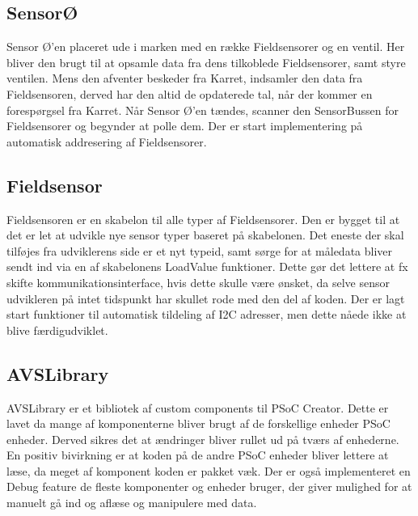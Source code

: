 \subsection{SensorØ}
Sensor Ø'en placeret ude i marken med en række Fieldsensorer og en ventil. Her bliver den brugt til at opsamle data fra dens tilkoblede Fieldsensorer, samt styre ventilen. Mens den afventer beskeder fra Karret, indsamler den data fra Fieldsensoren, derved har den altid de opdaterede tal, når der kommer en forespørgsel fra Karret. Når Sensor Ø'en tændes, scanner den SensorBussen for Fieldsensorer og begynder at polle dem. Der er start implementering på automatisk addresering af Fieldsensorer. 

\subsection{Fieldsensor}
Fieldsensoren er en skabelon til alle typer af Fieldsensorer. Den er bygget til at det er let at udvikle nye sensor typer baseret på skabelonen. Det eneste der skal tilføjes fra udviklerens side er et nyt typeid, samt sørge for at måledata bliver sendt ind via en af skabelonens LoadValue funktioner. Dette gør det lettere at fx skifte kommunikationsinterface, hvis dette skulle være ønsket, da selve sensor udvikleren på intet tidspunkt har skullet rode med den del af koden. Der er lagt start funktioner til automatisk tildeling af I2C adresser, men dette nåede ikke at blive færdigudviklet.

\subsection{AVSLibrary}
AVSLibrary er et bibliotek af custom components til PSoC Creator. Dette er lavet da mange af komponenterne bliver brugt af de forskellige enheder PSoC enheder. Derved sikres det at ændringer bliver rullet ud på tværs af enhederne. En positiv bivirkning er at koden på de andre PSoC enheder bliver lettere at læse, da meget af komponent koden er pakket væk. Der er også implementeret en Debug feature de fleste komponenter og enheder bruger, der giver mulighed for at manuelt gå ind og aflæse og manipulere med data.